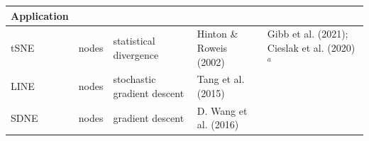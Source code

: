 \documentclass[11pt]{article}
\begin{document}
\begin{longtable}[]{@{}lllll@{}}
\begin{minipage}[b]{0.29\columnwidth}
Application\strut
\end{minipage}\tabularnewline
\midrule
\endhead
\begin{minipage}[t]{0.09\columnwidth}\raggedright
tSNE\strut
\end{minipage} & \begin{minipage}[t]{0.11\columnwidth}\raggedright
nodes\strut
\end{minipage} & \begin{minipage}[t]{0.23\columnwidth}\raggedright
statistical divergence\strut
\end{minipage} & \begin{minipage}[t]{0.14\columnwidth}\raggedright
Hinton \& Roweis (2002)\strut
\end{minipage} & \begin{minipage}[t]{0.29\columnwidth}\raggedright
Gibb et al. (2021); Cieslak et al. (2020) \(^a\)\strut
\end{minipage}\tabularnewline
\begin{minipage}[t]{0.09\columnwidth}\raggedright
LINE\strut
\end{minipage} & \begin{minipage}[t]{0.11\columnwidth}\raggedright
nodes\strut
\end{minipage} & \begin{minipage}[t]{0.23\columnwidth}\raggedright
stochastic gradient descent\strut
\end{minipage} & \begin{minipage}[t]{0.14\columnwidth}\raggedright
Tang et al. (2015)\strut
\end{minipage} & \begin{minipage}[t]{0.29\columnwidth}\raggedright
\strut
\end{minipage}\tabularnewline
\begin{minipage}[t]{0.09\columnwidth}\raggedright
SDNE\strut
\end{minipage} & \begin{minipage}[t]{0.11\columnwidth}\raggedright
nodes\strut
\end{minipage} & \begin{minipage}[t]{0.23\columnwidth}\raggedright
gradient descent\strut
\end{minipage} & \begin{minipage}[t]{0.14\columnwidth}\raggedright
D. Wang et al. (2016)\strut
\end{minipage} & \begin{minipage}[t]{0.29\columnwidth}\raggedright
\strut
\end{minipage}\tabularnewline

\end{longtable}
\end{document}
